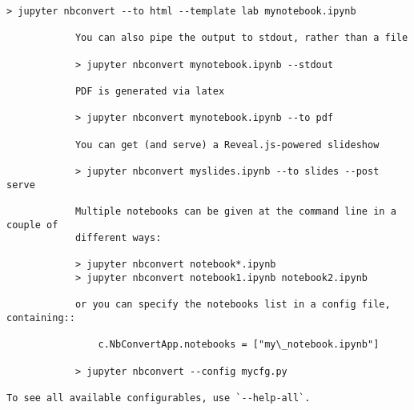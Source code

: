 \documentclass[11pt]{article}
\begin{document}
\begin{Verbatim}[commandchars=\\\{\}]
            > jupyter nbconvert --to html --template lab mynotebook.ipynb

            You can also pipe the output to stdout, rather than a file

            > jupyter nbconvert mynotebook.ipynb --stdout

            PDF is generated via latex

            > jupyter nbconvert mynotebook.ipynb --to pdf

            You can get (and serve) a Reveal.js-powered slideshow

            > jupyter nbconvert myslides.ipynb --to slides --post serve

            Multiple notebooks can be given at the command line in a couple of
            different ways:

            > jupyter nbconvert notebook*.ipynb
            > jupyter nbconvert notebook1.ipynb notebook2.ipynb

            or you can specify the notebooks list in a config file, containing::

                c.NbConvertApp.notebooks = ["my\_notebook.ipynb"]

            > jupyter nbconvert --config mycfg.py

To see all available configurables, use `--help-all`.

    \end{Verbatim}


    
    
    
\end{document}
